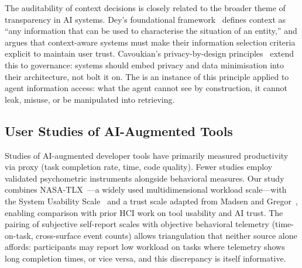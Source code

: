 The auditability of context decisions is closely related to the broader theme
of transparency in AI systems. Dey's foundational framework~\cite{dey2001context}
defines context as ``any information that can be used to characterise the
situation of an entity,'' and argues that context-aware systems must make their
information selection criteria explicit to maintain user trust. Cavoukian's
privacy-by-design principles~\cite{cavoukian2009privacybydesign} extend this to
governance: systems should embed privacy and data minimisation into their
architecture, not bolt it on. The \ContextGate is an instance of this principle
applied to agent information access: what the agent cannot see by construction,
it cannot leak, misuse, or be manipulated into retrieving.

\subsection{User Studies of AI-Augmented Tools}
\label{sec:related:userstudies}

Studies of AI-augmented developer tools have primarily measured productivity via
proxy (task completion rate, time, code quality). Fewer studies employ validated
psychometric instruments alongside behavioral measures. Our study combines
NASA-TLX~\cite{hart1988tlx}---a widely used multidimensional workload
scale---with the System Usability Scale~\cite{brooke1996sus} and a trust
scale adapted from Madsen and Gregor~\cite{madsen2000measuring}, enabling
comparison with prior HCI work on tool usability and AI trust. The pairing of
subjective self-report scales with objective behavioral telemetry (time-on-task,
cross-surface event counts) allows triangulation that neither source alone
affords: participants may report low workload on tasks where telemetry shows
long completion times, or vice versa, and this discrepancy is itself
informative.
